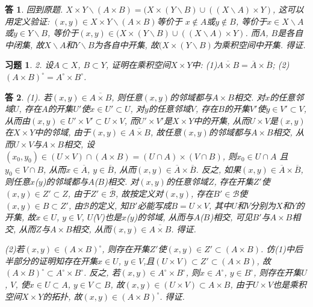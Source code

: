 \documentclass{ctexart}%
\newtheorem*{exercise}{习题}
\newtheorem*{solution}{答}
\theoremstyle{definition}
\theoremstyle{remark}
\begin{document}
\begin{solution}
回到原题. $X\times Y\backslash (A\times B)= (X\times (Y\backslash B) \cup((X\backslash A)\times Y)$, 这可以用定义验证: $(x,y)\in  X\times Y\backslash (A\times B)$等价于 $x\notin A$或$y\notin B$, 等价于$x\in X\backslash A$ 或$y\in Y\backslash B$, 等价于$(x,y)\in  (X\times (Y\backslash B) \cup((X\backslash A)\times Y)$. 而$A$, $B$是各自中闭集, 故$X\backslash A$和$Y\backslash B$为各自中开集, 故$(X\times (Y\backslash B)$为乘积空间中开集. 得证. 
\end{solution}

\begin{exercise}2. 设$A\subset X$, $B\subset Y$, 证明在乘积空间$X\times Y$中: (1)$\overline{A\times B}
=\overline{A}\times \overline{B}$; (2)$(A\times B)^\circ=A^\circ \times B^\circ$. 
\end{exercise}
\begin{solution}
(1). 若$(x,y)\in \overline{A\times B}$, 则任意$(x,y)$的邻域都与$A\times B$相交.
对$x$的任意邻域$U$, 存在$A$的开集$U'$使$x\in U' \subset U$, 对$y$的任意邻域$V$, 存在$B$的开集$V'$使$y\in V'\subset V$, 从而由$(x,y)\in U'\times V'\subset U\times V$, 而$U'\times V'$是$X\times Y$中的开集, 从而$U\times V$是$(x,y)$在$X\times Y$中的邻域, 由于$(x,y)\in \overline{A\times B}$, 故任意$(x,y)$的邻域都与$A\times B$相交, 从而$U\times V$与$A\times B$相交, 设$(x_0,y_0)\in (U\times V)\cap (A\times B)=(U\cap A)\times (V\cap B)$, 则$x_0\in U\cap A$ 且$y_0\in V\cap B$, 从而$x\in \overline{A}$, $y\in \overline{B}$, 从而$(x,y)\in \overline{A}\times\overline{B}$. 反之, 如果$(x,y)\in \overline{A}\times\overline{B}$, 则任意$x$($y$)的邻域都与$A$($B$)相交. 对$(x,y)$的任意邻域$Z$, 存在开集$Z'$使$(x,y)\in Z'\subset Z$, 由于$Z'\in \overline{\mathscr{B}}$, 故按定义对$(x,y)$, 存在$B'\in\mathscr{B}$使$(x,y)\in B\subset Z'$, 由$\mathscr{B}$的定义, 知$B'$必能写成$B=U\times V$, 其中$U$和$V$分别为$X$和$Y$的开集, 故$x\in U$, $y\in V$, $U$($V$)也是$x$($y$)的邻域, 从而与$A$($B$)相交, 可见$B'$与$A\times B$相交, 从而$Z$与$A\times B$相交, 从而$(x,y)\in \overline{A\times B}$. 得证. 

(2)若$(x,y)\in (A\times B)^\circ$, 则存在开集$Z'$使$(x,y)\in Z'\subset (A\times B)$. 仿(1)中后半部分的证明知存在开集$x\in U$, $y\in V$,且$(U\times V)\subset Z'\subset (A\times B)$, 故$(A\times B)^\circ \subset A^\circ\times B^\circ$. 反之, 若$(x,y)\in A^\circ\times B^\circ$, 则$x\in A^\circ$, $y\in B^\circ$, 则存在开集$U$, $V$, 使$x\in U\subset A$, $y\in V\subset B$, 故$(x,y)\in (U\times V)\subset A\times B$, 由于$U\times V$也是乘积空间$X\times Y$的拓扑, 故$(x,y)\in (A\times B)^\circ$. 得证.  
\end{solution}
\end{document}
